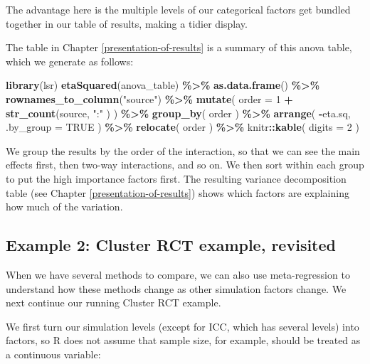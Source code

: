 \documentclass[
]{book}
\newenvironment{Shaded}{\begin{snugshade}}{\end{snugshade}}
\newcommand{\AttributeTok}[1]{\textcolor[rgb]{0.13,0.29,0.53}{#1}}
\newcommand{\ConstantTok}[1]{\textcolor[rgb]{0.56,0.35,0.01}{#1}}
\newcommand{\DecValTok}[1]{\textcolor[rgb]{0.00,0.00,0.81}{#1}}
\newcommand{\FunctionTok}[1]{\textcolor[rgb]{0.13,0.29,0.53}{\textbf{#1}}}
\newcommand{\NormalTok}[1]{#1}
\newcommand{\SpecialCharTok}[1]{\textcolor[rgb]{0.81,0.36,0.00}{\textbf{#1}}}
\newcommand{\StringTok}[1]{\textcolor[rgb]{0.31,0.60,0.02}{#1}}
\begin{document}
The advantage here is the multiple levels of our categorical factors get bundled together in our table of results, making a tidier display.

The table in Chapter \ref{presentation-of-results} is a summary of this anova table, which we generate as follows:

\begin{Shaded}
\begin{Highlighting}[]
\FunctionTok{library}\NormalTok{(lsr)}
\FunctionTok{etaSquared}\NormalTok{(anova\_table) }\SpecialCharTok{\%\textgreater{}\%}
  \FunctionTok{as.data.frame}\NormalTok{() }\SpecialCharTok{\%\textgreater{}\%}
  \FunctionTok{rownames\_to\_column}\NormalTok{(}\StringTok{"source"}\NormalTok{) }\SpecialCharTok{\%\textgreater{}\%}
  \FunctionTok{mutate}\NormalTok{( }\AttributeTok{order =} \DecValTok{1} \SpecialCharTok{+} \FunctionTok{str\_count}\NormalTok{(source, }\StringTok{":"}\NormalTok{ ) ) }\SpecialCharTok{\%\textgreater{}\%}
  \FunctionTok{group\_by}\NormalTok{( order ) }\SpecialCharTok{\%\textgreater{}\%}
  \FunctionTok{arrange}\NormalTok{( }\SpecialCharTok{{-}}\NormalTok{eta.sq, }\AttributeTok{.by\_group =} \ConstantTok{TRUE}\NormalTok{ ) }\SpecialCharTok{\%\textgreater{}\%}
  \FunctionTok{relocate}\NormalTok{( order ) }\SpecialCharTok{\%\textgreater{}\%}
\NormalTok{  knitr}\SpecialCharTok{::}\FunctionTok{kable}\NormalTok{( }\AttributeTok{digits =} \DecValTok{2}\NormalTok{ )}
\end{Highlighting}
\end{Shaded}

We group the results by the order of the interaction, so that we can see the main effects first, then two-way interactions, and so on.
We then sort within each group to put the high importance factors first.
The resulting variance decomposition table (see Chapter \ref{presentation-of-results}) shows which factors are explaining how much of the variation.

\subsection{Example 2: Cluster RCT example, revisited}\label{example-2-cluster-rct-example-revisited}

When we have several methods to compare, we can also use meta-regression to understand how these methods change as other simulation factors change.
We next continue our running Cluster RCT example.

We first turn our simulation levels (except for ICC, which has several levels) into factors, so R does not assume that sample size, for example, should be treated as a continuous variable:
\end{document}
